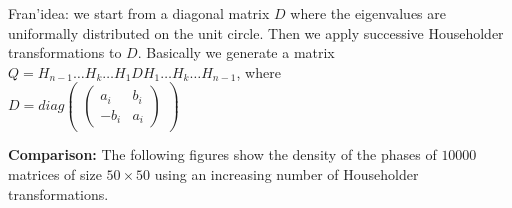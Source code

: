 \documentclass[a4paper]{article}
\begin{document}
Fran'idea: we start from a diagonal matrix $D$ where the eigenvalues are uniformally distributed 
on the unit circle. Then we apply successive Householder transformations to $D$.
Basically we generate a matrix \\
 $Q = H_{n-1}\ldots H_k \ldots H_1 D H_1 \ldots H_k \ldots H_{n-1}$, 
where  \\
$D  = diag
 \begin{pmatrix}
  \begin{pmatrix}
  a_i & b_i  \\
  -b_i & a_i 
 \end{pmatrix}
 \end{pmatrix}
$


\textbf{Comparison:}
The following figures show the density of the phases of $10000$ matrices 
of size $50 \times 50$ using an increasing number of Householder transformations. 
\end{document}
